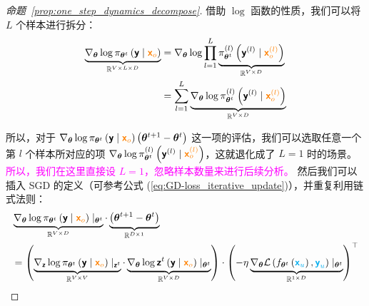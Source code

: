 \documentclass[citestyle=gb7714-2015, bibstyle=gb7714-2015,lang=cn,14pt,scheme=chinese]{elegantbook}
\begin{document}
\begin{proof}[命题~\ref{prop:one_step_dynamics_decompose}]
借助 \(\log\) 函数的性质，我们可以将 \(L\) 个样本进行拆分：
\[
\begin{aligned}
    \underbrace{\nabla_{\bm{\theta}} \log \pi_{\bm{\theta}^{t}} \left( \bm{\mathsf{y}} \mid \textcolor{orange}{\bm{\mathsf{x}}_{o}} \right)}_{\mathbb{R}^{V \times L \times D}} &= \nabla_{\bm{\theta}} \log \prod_{l=1}^{L} \underbrace{\pi_{\bm{\theta}^{t}}^{(l)} \left( \bm{\mathsf{y}}^{(l)} \mid \textcolor{orange}{\bm{\mathsf{x}}_{o}^{(l)}} \right)}_{\mathbb{R}^{V \times D}} \\
    &= \sum_{l=1}^{L} \underbrace{ \nabla_{\bm{\theta}} \log \pi_{\bm{\theta}^{t}}^{(l)} \left( \bm{\mathsf{y}}^{(l)} \mid \textcolor{orange}{\bm{\mathsf{x}}_{o}^{(l)}} \right) }_{\mathbb{R}^{V \times D}}
\end{aligned}
\]

所以，对于 \(\nabla_{\bm{\theta}} \log \pi_{\bm{\theta}^{t}} \left( \bm{\mathsf{y}} \mid \textcolor{orange}{\bm{\mathsf{x}}_{o}} \right) \left( \bm{\theta}^{t+1} - \bm{\theta}^{t} \right)\) 这一项的评估，我们可以选取任意一个第 \(l\) 个样本所对应的项 \(\nabla_{\bm{\theta}} \log \pi_{\bm{\theta}^{t}}^{(l)} \left( \bm{\mathsf{y}}^{(l)} \mid \textcolor{orange}{\bm{\mathsf{x}}_{o}^{(l)}} \right)\)，这就退化成了 \(L=1\) 时的场景。
\textcolor{magenta}{所以，我们在这里直接设 \(L=1\)，忽略样本数量来进行后续分析。}
然后我们可以插入 SGD 的定义（可参考公式 (\ref{eq:GD-loss_iterative_update})），并重复利用链式法则：
\begin{equation}\label{eq:SGD-decomposition-detail}
\begin{aligned}
    &\underbrace{\nabla_{\bm{\theta}} \log \pi_{\bm{\theta}^{t}} \left( \bm{\mathsf{y}} \mid \textcolor{orange}{\bm{\mathsf{x}}_{o}} \right) \mid_{\bm{\theta}^{t}}}_{\mathbb{R}^{V \times D}} \cdot \underbrace{\left( \bm{\theta}^{t+1} - \bm{\theta}^{t} \right)}_{\mathbb{R}^{D \times 1}} \\
    &= \left( \underbrace{\nabla_{\bm{\mathsf{z}}} \log \pi_{\bm{\theta}^{t}} \left( \bm{\mathsf{y}} \mid \textcolor{orange}{\bm{\mathsf{x}}_{o}} \right) \mid_{\bm{\mathsf{z}}^{t}}}_{\mathbb{R}^{V \times V }} \cdot \underbrace{\nabla_{\bm{\theta}} \log \bm{\mathsf{z}}^{t} \left( \bm{\mathsf{y}} \mid \textcolor{orange}{\bm{\mathsf{x}}_{o}} \right) \mid_{\bm{\theta}^{t}}}_{\mathbb{R}^{V \times D}} \right) \cdot \left( - \eta \underbrace{\nabla_{\bm{\theta}} \mathcal{L} \left( f_{\bm{\theta}^{t}} \left( \textcolor{cyan}{\bm{\mathsf{x}}_{u}} \right), \textcolor{cyan}{\bm{\mathsf{y}}_{u}} \right) \mid_{\bm{\theta}^{t}}}_{\mathbb{R}^{1 \times D}}  \right)^{\top} \\

\end{aligned}
\end{equation}
\end{proof}
\end{document}
